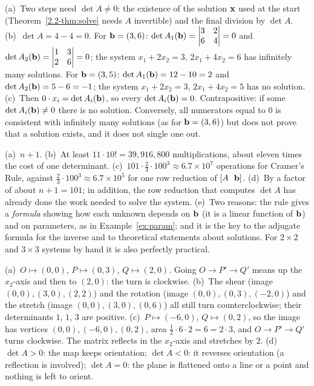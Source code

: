 \documentclass[11pt]{article}
\begin{document}
\begin{description}[leftmargin=0pt,itemsep=5pt]
  \item[Pause and think \ref{think:hyp}.] (a)~Two steps need $\det A\neq0$: the existence of the solution $\mathbf{x}$ used at the start (Theorem~\ref{2.2-thm:solve} needs $A$ invertible) and the final division by $\det A$. (b)~$\det A=4-4=0$. For $\mathbf{b}=(3,6)$: $\det A_1(\mathbf{b})=\begin{vmatrix}3&2\\6&4\end{vmatrix}=0$ and $\det A_2(\mathbf{b})=\begin{vmatrix}1&3\\2&6\end{vmatrix}=0$; the system $x_1+2x_2=3$, $2x_1+4x_2=6$ has infinitely many solutions. For $\mathbf{b}=(3,5)$: $\det A_1(\mathbf{b})=12-10=2$ and $\det A_2(\mathbf{b})=5-6=-1$; the system $x_1+2x_2=3$, $2x_1+4x_2=5$ has no solution. (c)~Then $0\cdot x_i=\det A_i(\mathbf{b})$, so every $\det A_i(\mathbf{b})=0$. Contrapositive: if some $\det A_i(\mathbf{b})\neq0$ there is no solution. Conversely, all numerators equal to $0$ is consistent with infinitely many solutions (as for $\mathbf{b}=(3,6)$) but does not prove that a solution exists, and it does not single one out.
  \item[Pause and think \ref{think:cost}.] (a)~$n+1$. (b)~At least $11\cdot10!=39{,}916{,}800$ multiplications, about eleven times the cost of one determinant. (c)~$101\cdot\tfrac23\cdot100^3\approx6.7\times10^7$ operations for Cramer's Rule, against $\tfrac23\cdot100^3\approx6.7\times10^5$ for one row reduction of $[A\ \ \bv{b}]$. (d)~By a factor of about $n+1=101$; in addition, the row reduction that computes $\det A$ has already done the work needed to solve the system. (e)~Two reasons: the rule gives a \emph{formula} showing how each unknown depends on $\mathbf{b}$ (it is a linear function of $\mathbf{b}$) and on parameters, as in Example~\ref{ex:param}; and it is the key to the adjugate formula for the inverse and to theoretical statements about solutions. For $2\times2$ and $3\times3$ systems by hand it is also perfectly practical.
  \item[Pause and think \ref{think:sign}.] (a)~$O\mapsto(0,0)$, $P\mapsto(0,3)$, $Q\mapsto(2,0)$. Going $O\to P'\to Q'$ means up the $x_2$-axis and then to $(2,0)$: the turn is clockwise. (b)~The shear (image $(0,0),(3,0),(2,2)$) and the rotation (image $(0,0),(0,3),(-2,0)$) and the stretch (image $(0,0),(3,0),(0,6)$) all still turn counterclockwise; their determinants $1$, $1$, $3$ are positive. (c)~$P\mapsto(-6,0)$, $Q\mapsto(0,2)$, so the image has vertices $(0,0),(-6,0),(0,2)$, area $\tfrac12\cdot6\cdot2=6=2\cdot3$, and $O\to P'\to Q'$ turns clockwise. The matrix reflects in the $x_2$-axis and stretches by $2$. (d)~$\det A>0$: the map keeps orientation; $\det A<0$: it reverses orientation (a reflection is involved); $\det A=0$: the plane is flattened onto a line or a point and nothing is left to orient.

\end{description}
\end{document}
